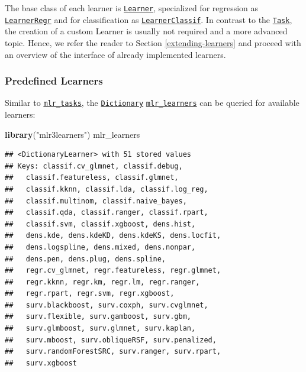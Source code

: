 \documentclass[]{article}
\newenvironment{Shaded}{\begin{snugshade}}{\end{snugshade}}
\newcommand{\KeywordTok}[1]{\textcolor[rgb]{0.13,0.29,0.53}{\textbf{#1}}}
\newcommand{\NormalTok}[1]{#1}
\newcommand{\StringTok}[1]{\textcolor[rgb]{0.31,0.60,0.02}{#1}}
\renewenvironment{Shaded} {\begin{snugshade}\small} {\end{snugshade}}
\begin{document}
The base class of each learner is \href{https://mlr3.mlr-org.com/reference/Learner.html}{\texttt{Learner}}, specialized for regression as \href{https://mlr3.mlr-org.com/reference/LearnerRegr.html}{\texttt{LearnerRegr}} and for classification as \href{https://mlr3.mlr-org.com/reference/LearnerClassif.html}{\texttt{LearnerClassif}}.
In contrast to the \href{https://mlr3.mlr-org.com/reference/Task.html}{\texttt{Task}}, the creation of a custom Learner is usually not required and a more advanced topic.
Hence, we refer the reader to Section \ref{extending-learners} and proceed with an overview of the interface of already implemented learners.

\hypertarget{learners-predefined}{%
\subsubsection{Predefined Learners}\label{learners-predefined}}

Similar to \href{https://mlr3.mlr-org.com/reference/mlr_tasks.html}{\texttt{mlr\_tasks}}, the \href{https://mlr3misc.mlr-org.com/reference/Dictionary.html}{\texttt{Dictionary}} \href{https://mlr3.mlr-org.com/reference/mlr_learners.html}{\texttt{mlr\_learners}} can be queried for available learners:

\begin{Shaded}
\begin{Highlighting}[]
\KeywordTok{library}\NormalTok{(}\StringTok{"mlr3learners"}\NormalTok{)}
\NormalTok{mlr_learners}
\end{Highlighting}
\end{Shaded}

\begin{verbatim}
## <DictionaryLearner> with 51 stored values
## Keys: classif.cv_glmnet, classif.debug,
##   classif.featureless, classif.glmnet,
##   classif.kknn, classif.lda, classif.log_reg,
##   classif.multinom, classif.naive_bayes,
##   classif.qda, classif.ranger, classif.rpart,
##   classif.svm, classif.xgboost, dens.hist,
##   dens.kde, dens.kdeKD, dens.kdeKS, dens.locfit,
##   dens.logspline, dens.mixed, dens.nonpar,
##   dens.pen, dens.plug, dens.spline,
##   regr.cv_glmnet, regr.featureless, regr.glmnet,
##   regr.kknn, regr.km, regr.lm, regr.ranger,
##   regr.rpart, regr.svm, regr.xgboost,
##   surv.blackboost, surv.coxph, surv.cvglmnet,
##   surv.flexible, surv.gamboost, surv.gbm,
##   surv.glmboost, surv.glmnet, surv.kaplan,
##   surv.mboost, surv.obliqueRSF, surv.penalized,
##   surv.randomForestSRC, surv.ranger, surv.rpart,
##   surv.xgboost
\end{verbatim}
\end{document}
